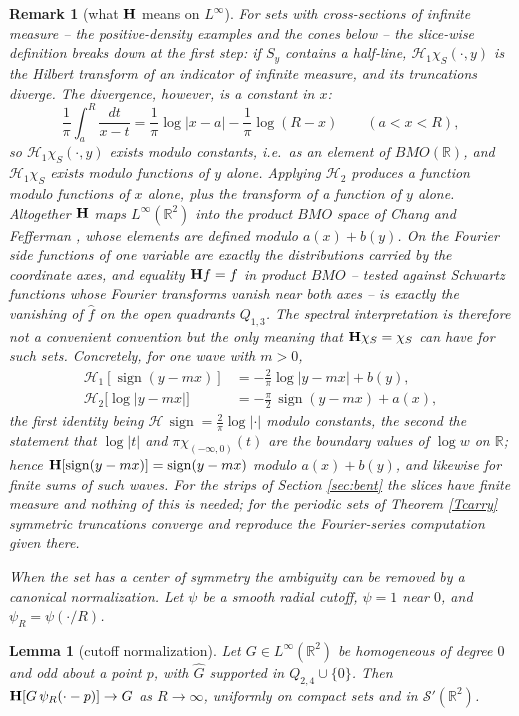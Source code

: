 \documentclass{article}
\newcommand{\tmop}[1]{\ensuremath{\operatorname{#1}}}
\newtheorem{lemma}{Lemma}
\newtheorem{remark}{Remark}
\def\H{{\bf H}}
\def\HH{{\mathcal H}}
\def\R{{\mathbb R}}
\begin{document}
	\begin{remark}[what $\H$ means on $L^\infty$]\label{Rbmo}
		For sets with cross-sections of infinite measure -- the positive-density examples and the cones below -- the slice-wise definition breaks down at the first step: if $S_y$ contains a half-line, $\HH_1\chi_S(\cdot,y)$ is the Hilbert transform of an indicator of infinite measure, and its truncations diverge. The divergence, however, is a constant in $x$:
		$$\frac1\pi\int_a^R\frac{dt}{x-t}=\frac1\pi\log|x-a|-\frac1\pi\log(R-x)\qquad(a<x<R),$$
		so $\HH_1\chi_S(\cdot,y)$ exists modulo constants, i.e.\ as an element of $BMO(\R)$, and $\HH_1\chi_S$ exists modulo functions of $y$ alone. Applying $\HH_2$ produces a function modulo functions of $x$ alone, plus the transform of a function of $y$ alone. Altogether $\H$ maps $L^\infty(\R^2)$ into the product $BMO$ space of Chang and Fefferman \cite{CF}, whose elements are defined modulo $a(x)+b(y)$. On the Fourier side functions of one variable are exactly the distributions carried by the coordinate axes, and equality $\H f=f$ in product $BMO$ -- tested against Schwartz functions whose Fourier transforms vanish near both axes -- is exactly the vanishing of $\hat f$ on the open quadrants $Q_{1,3}$. The spectral interpretation is therefore not a convenient convention but the only meaning that $\H\chi_S=\chi_S$ can have for such sets. Concretely, for one wave with $m>0$,
		\begin{align*}
		\HH_1[\tmop{sign}(y-mx)]&=-\frac2\pi\log|y-mx|+b(y),\\
		\HH_2\big[\log|y-mx|\big]&=-\frac\pi2\,\tmop{sign}(y-mx)+a(x),
		\end{align*}
		the first identity being $\HH\,\tmop{sign}=\frac2\pi\log|\cdot|$ modulo constants, the second the statement that $\log|t|$ and $\pi\chi_{(-\infty,0)}(t)$ are the boundary values of $\log w$ on $\R$; hence $\H[\tmop{sign}(y-mx)]=\tmop{sign}(y-mx)$ modulo $a(x)+b(y)$, and likewise for finite sums of such waves. For the strips of Section \ref{sec:bent} the slices have finite measure and nothing of this is needed; for the periodic sets of Theorem \ref{Tcarry} symmetric truncations converge and reproduce the Fourier-series computation given there.

		When the set has a center of symmetry the ambiguity can be removed by a canonical normalization. Let $\psi$ be a smooth radial cutoff, $\psi=1$ near $0$, and $\psi_R=\psi(\cdot/R)$.
	\end{remark}

	\begin{lemma}[cutoff normalization]\label{Lcut}
		Let $G\in L^\infty(\R^2)$ be homogeneous of degree $0$ and odd about a point $p$, with $\hat G$ supported in $Q_{2,4}\cup\{0\}$. Then $\H[G\,\psi_R(\cdot-p)]\to G$ as $R\to\infty$, uniformly on compact sets and in $\mathcal S'(\R^2)$.
	\end{lemma}
\end{document}
